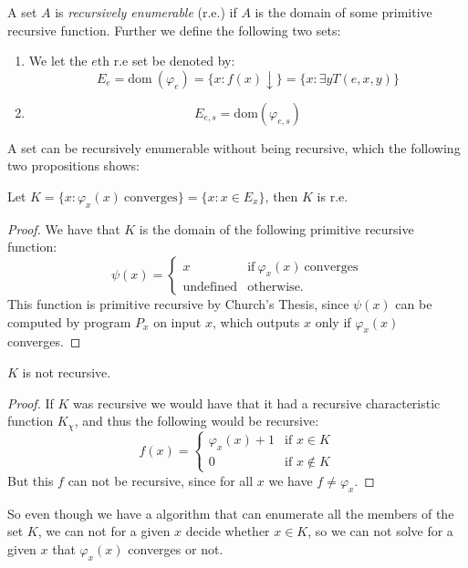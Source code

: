 \documentclass[../main.tex]{subfiles}
\begin{document}
\begin{defi}
	A set $A$ is \textit{recursively enumerable} (r.e.) if $A$ is the domain of some
	primitive recursive function. Further we define the following two sets:
	\begin{enumerate}
		\item We let the $e$th r.e set be denoted by:
			$$E_e=\text{dom}\ (\varphi_e)= \{x:f(x)\downarrow\}=\{x:\exists
			y T(e,x,y)\}$$
		\item \[E_{e,s}=\text{dom} (\varphi_{e,s})\]
	\end{enumerate}
\end{defi}
A set can be recursively enumerable without being recursive, which the
following two propositions shows:
\begin{prop}
	Let $K=\{x:\varphi_x(x)\ \text{converges}\}=\{x:x\in E_x\}$, then $K$
	is r.e.
\end{prop}
\begin{proof}
	We have that $K$ is the domain of the following primitive recursive
	function:
	\[\psi(x)=\begin{cases}
		x &\text{if}\ \varphi_x(x)\ \text{converges}\\
		\text{undefined} &\text{otherwise.}
	\end{cases}\]
	This function is primitive recursive by Church's Thesis, since $\psi(x)$
	can be computed by program $P_x$ on input $x$, which outputs $x$ only
	if $\varphi_x(x)$ converges.
\end{proof}
\begin{prop}
	$K$ is not recursive.
\end{prop}
\begin{proof}
	If $K$ was recursive we would have that it had a recursive characteristic
	function $K_\chi$, and thus the following would be recursive:
	\[f(x)=\begin{cases}
		\varphi_x(x)+1 & \text{if } x\in K\\
		0 & \text{if } x\not \in K
	\end{cases}\]
	But this $f$ can not be recursive, since for all $x$ we have $f\not
	=\varphi_x$.
\end{proof}

So even though we have a algorithm that can enumerate all the members of the
set $K$, we can not for a given $x$ decide whether $x\in K$, so we can not
solve for a given $x$ that $\varphi_x(x)$ converges or not.
\end{document}
